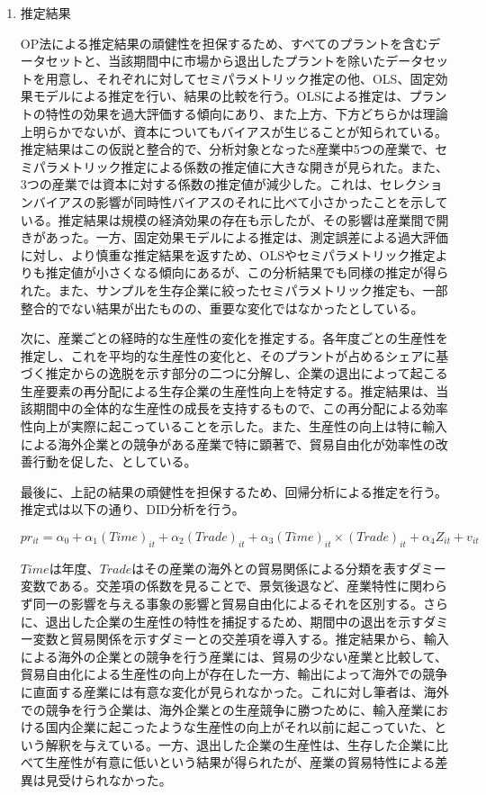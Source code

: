\documentclass{jsarticle}
\begin{document}
\begin{enumerate}
\item 推定結果
 
OP法による推定結果の頑健性を担保するため、すべてのプラントを含むデータセットと、当該期間中に市場から退出したプラントを除いたデータセットを用意し、それぞれに対してセミパラメトリック推定の他、OLS、固定効果モデルによる推定を行い、結果の比較を行う。OLSによる推定は、プラントの特性の効果を過大評価する傾向にあり、また上方、下方どちらかは理論上明らかでないが、資本についてもバイアスが生じることが知られている。推定結果はこの仮説と整合的で、分析対象となった8産業中5つの産業で、セミパラメトリック推定による係数の推定値に大きな開きが見られた。また、3つの産業では資本に対する係数の推定値が減少した。これは、セレクションバイアスの影響が同時性バイアスのそれに比べて小さかったことを示している。推定結果は規模の経済効果の存在も示したが、その影響は産業間で開きがあった。一方、固定効果モデルによる推定は、測定誤差による過大評価に対し、より慎重な推定結果を返すため、OLSやセミパラメトリック推定よりも推定値が小さくなる傾向にあるが、この分析結果でも同様の推定が得られた。また、サンプルを生存企業に絞ったセミパラメトリック推定も、一部整合的でない結果が出たものの、重要な変化ではなかったとしている。

次に、産業ごとの経時的な生産性の変化を推定する。各年度ごとの生産性を推定し、これを平均的な生産性の変化と、そのプラントが占めるシェアに基づく推定からの逸脱を示す部分の二つに分解し、企業の退出によって起こる生産要素の再分配による生存企業の生産性向上を特定する。推定結果は、当該期間中の全体的な生産性の成長を支持するもので、この再分配による効率性向上が実際に起こっていることを示した。また、生産性の向上は特に輸入による海外企業との競争がある産業で特に顕著で、貿易自由化が効率性の改善行動を促した、としている。

最後に、上記の結果の頑健性を担保するため、回帰分析による推定を行う。推定式は以下の通り、DID分析を行う。

\[ pr_{it} = \alpha_0 + \alpha_1 (\textit{Time})_{it} + \alpha_2(\textit{Trade})_{it}
+ \alpha_3 (\textit{Time})_{it} \times (\textit{Trade})_{it} + \alpha_4 Z_{it} + v_{it} \]

$\textit{Time}$は年度、$\textit{Trade}$はその産業の海外との貿易関係による分類を表すダミー変数である。交差項の係数を見ることで、景気後退など、産業特性に関わらず同一の影響を与える事象の影響と貿易自由化によるそれを区別する。さらに、退出した企業の生産性の特性を捕捉するため、期間中の退出を示すダミー変数と貿易関係を示すダミーとの交差項を導入する。推定結果から、輸入による海外の企業との競争を行う産業には、貿易の少ない産業と比較して、貿易自由化による生産性の向上が存在した一方、輸出によって海外での競争に直面する産業には有意な変化が見られなかった。これに対し筆者は、海外での競争を行う企業は、海外企業との生産競争に勝つために、輸入産業における国内企業に起こったような生産性の向上がそれ以前に起こっていた、という解釈を与えている。一方、退出した企業の生産性は、生存した企業に比べて生産性が有意に低いという結果が得られたが、産業の貿易特性による差異は見受けられなかった。


\end{enumerate}
\end{document}
